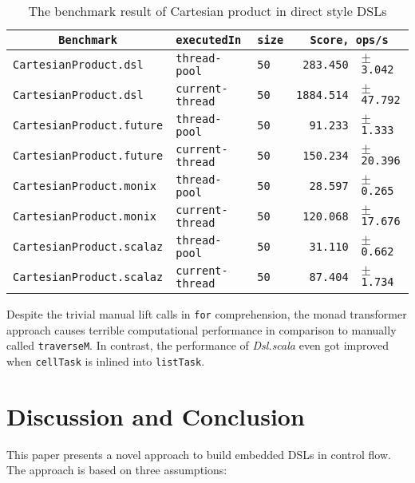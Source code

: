 \begin{table}[htbp]
  \begin{tabular}{l|l|l|rl}
   \multicolumn{1}{c|}{\texttt{Benchmark}} & \texttt{executedIn} & \texttt{size} & \multicolumn{2}{c}{\texttt{Score, ops/s}} \\
  \hline
  \texttt{CartesianProduct.dsl} & \texttt{thread-pool} & \texttt{50} & \texttt{283.450} & \scriptsize $\pm$ \texttt{3.042}  \\
  \texttt{CartesianProduct.dsl} & \texttt{current-thread} & \texttt{50} & \texttt{1884.514} & \scriptsize $\pm$ \texttt{47.792}  \\
  \texttt{CartesianProduct.future} & \texttt{thread-pool} & \texttt{50} & \texttt{91.233} & \scriptsize $\pm$ \texttt{1.333}  \\
  \texttt{CartesianProduct.future} & \texttt{current-thread} & \texttt{50} & \texttt{150.234} & \scriptsize $\pm$ \texttt{20.396}  \\
  \texttt{CartesianProduct.monix} & \texttt{thread-pool} & \texttt{50} & \texttt{28.597} & \scriptsize $\pm$ \texttt{0.265}  \\
  \texttt{CartesianProduct.monix} & \texttt{current-thread} & \texttt{50} & \texttt{120.068} & \scriptsize $\pm$ \texttt{17.676}  \\
  \texttt{CartesianProduct.scalaz} & \texttt{thread-pool} & \texttt{50} & \texttt{31.110} & \scriptsize $\pm$ \texttt{0.662}  \\
  \texttt{CartesianProduct.scalaz} & \texttt{current-thread} & \texttt{50} & \texttt{87.404} & \scriptsize $\pm$ \texttt{1.734}  \\
  \end{tabular}
  \caption{The benchmark result of Cartesian product in direct style DSLs}
  \label{CartesianProduct}
\end{table}

Despite the trivial manual lift calls in \lstinline{for} comprehension, the monad transformer approach causes terrible computational performance in comparison to manually called \lstinline{traverseM}. In contrast, the performance of \textit{Dsl.scala} even got improved when \lstinline{cellTask} is inlined into \lstinline{listTask}.

\section{Discussion and Conclusion}\label{Conclusion}

This paper presents a novel approach to build embedded DSLs in control flow. The approach is based on three assumptions:

